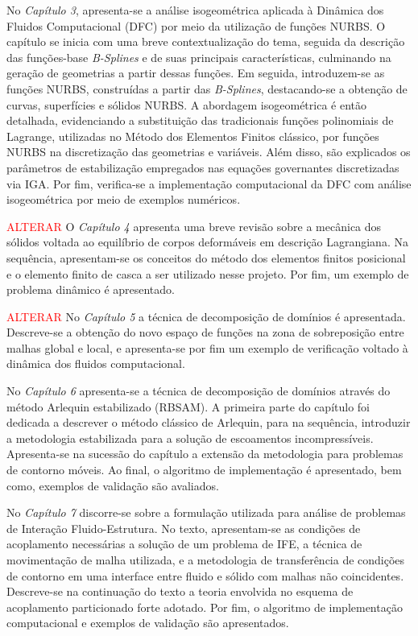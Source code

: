 \documentclass[tese_patricia.tex]{subfiles}
\begin{document}
No \textit{Capítulo 3}, apresenta-se a análise isogeométrica aplicada à Dinâmica dos Fluidos Computacional (DFC) por meio da utilização de funções NURBS. O capítulo se inicia com uma breve contextualização do tema, seguida da descrição das funções-base \textit{B-Splines} e de suas principais características, culminando na geração de geometrias a partir dessas funções. Em seguida, introduzem-se as funções NURBS, construídas a partir das \textit{B-Splines}, destacando-se a obtenção de curvas, superfícies e sólidos NURBS. A abordagem isogeométrica é então detalhada, evidenciando a substituição das tradicionais funções polinomiais de Lagrange, utilizadas no Método dos Elementos Finitos clássico, por funções NURBS na discretização das geometrias e variáveis. Além disso, são explicados os parâmetros de estabilização empregados nas equações governantes discretizadas via IGA. Por fim, verifica-se a implementação computacional da DFC com análise isogeométrica por meio de exemplos numéricos.

\textcolor{red}{ALTERAR}
O \textit{Capítulo 4} apresenta uma breve revisão sobre a mecânica dos sólidos voltada ao equilíbrio de corpos deformáveis em descrição Lagrangiana.  Na sequência, apresentam-se os conceitos do método dos elementos finitos posicional e o elemento finito de casca a ser utilizado nesse projeto. Por fim, um exemplo de problema dinâmico é apresentado.

\textcolor{red}{ALTERAR}
No \textit{Capítulo 5} a técnica de decomposição de domínios é apresentada. Descreve-se a obtenção do novo espaço de funções na zona de sobreposição entre malhas global e local, e apresenta-se por fim um exemplo de verificação voltado à dinâmica dos fluidos computacional.

No \textit{Capítulo 6} apresenta-se a técnica de decomposição de domínios através do método Arlequin estabilizado (RBSAM). A primeira parte do capítulo foi dedicada a descrever o método clássico de Arlequin, para na sequência, introduzir a metodologia estabilizada para a solução de escoamentos incompressíveis. Apresenta-se na sucessão do capítulo a extensão da metodologia para problemas de contorno móveis. Ao final, o algoritmo de implementação é apresentado, bem como, exemplos de validação são avaliados.

No \textit{Capítulo 7} discorre-se sobre a formulação utilizada para análise de problemas de Interação Fluido-Estrutura. No texto, apresentam-se as condições de acoplamento necessárias a solução de um problema de IFE, a técnica de movimentação de malha utilizada, e a metodologia de transferência de condições de contorno em uma interface entre fluido e sólido com malhas não coincidentes. Descreve-se na continuação do texto a teoria envolvida no esquema de acoplamento particionado forte adotado. Por fim, o algoritmo de implementação computacional e exemplos de validação são apresentados.
\end{document}
